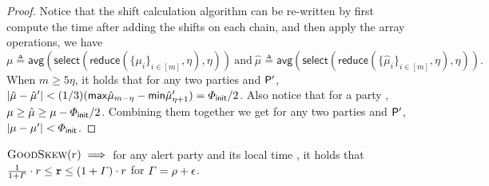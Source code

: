 \begin{proof}
    Notice that the shift calculation algorithm can be re-written by first compute the time after adding the shifts on each chain, and then apply the array operations, we have
    \begin{equation*}
        \mu \triangleq \mathsf{avg}(\mathsf{select} (\mathsf{reduce} ( \{ \mu_i \}_{i \in [m]}, \eta ), \eta ))
        ~\text{and}~
        \hat{\mu} \triangleq \mathsf{avg}(\mathsf{select} (\mathsf{reduce} ( \{ \hat{\mu}_i \}_{i \in [m]}, \eta ), \eta )).
    \end{equation*}
    When $m \ge 5\eta$, it holds that for any two parties \party and $\mathsf{P}'$, $|\hat{\mu} - \hat{\mu}'| < (1 / 3) (\mathsf{max} \hat{\mu}_{m - \eta} - \mathsf{min} \hat{\mu}'_{\eta + 1}) = \varPhi_{\mathsf{init}} / 2$.
    Also notice that for a party \party, $\mu \ge \hat{\mu} \ge \mu - \varPhi_{\mathsf{init}} / 2$.
    Combining them together we get for any two parties \party and $\mathsf{P}'$, $|\mu - \mu'| < \varPhi_{\mathsf{init}}$.
\end{proof}

\begin{lemma} \label{lemma:good-accuracy}
    $\textsc{GoodSkew}(r) \implies$ for any alert party \party and its local time \round, it holds that $\frac{1}{1 + \varGamma} \cdot r \le \mathtt{r} \le (1 + \varGamma) \cdot r$ for $\varGamma = \rho + \epsilon$.
\end{lemma}

